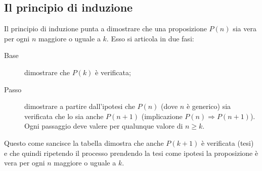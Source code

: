 \subsection{Il principio di induzione}
Il principio di induzione punta a dimostrare che una proposizione $P(n)$ sia vera per ogni $n$ maggiore o uguale a $k$. Esso si articola in due fasi:
\begin{description}
	\item[Base] dimostrare che $P(k)$ è verificata;
	\item[Passo] dimostrare a partire dall'ipotesi che $P(n)$ (dove $n$ è generico) sia verificata che lo sia anche $P(n+1)$ (implicazione $P(n)\Rightarrow P(n+1)$). Ogni passaggio deve valere per qualunque valore di $n\geq k$.
\end{description}
Questo come sancisce la tabella dimostra che anche $P(k+1)$ è verificata (tesi) e che quindi ripetendo il processo prendendo la tesi come ipotesi la proposizione è vera per ogni $n$ maggiore o uguale a $k$.


